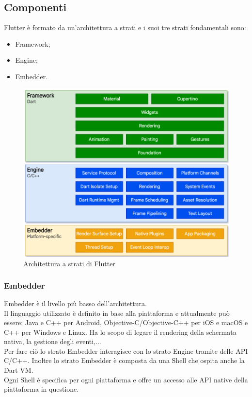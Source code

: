 \subsection{Componenti}
Flutter è formato da un'architettura a strati e i suoi tre strati fondamentali sono:
\begin{itemize}
	\item Framework; 
	\item Engine;  
	\item Embedder.\\
\end{itemize}
\begin{figure}[htbp]	
	\centering
	\includegraphics[width=13cm]{immagini/composizione.png}
	\caption{Architettura a strati di Flutter}
	\label{fig:Architettura a strati di Flutter}
\end{figure}

\newpage

\subsubsection{Embedder}
Embedder è il livello più basso dell'architettura.\\
Il linguaggio utilizzato è definito in base alla piattaforma e attualmente può essere: Java e C++ per Android, Objective-C/Objective-C++ per iOS e macOS e C++ per Windows e Linux.
Ha lo scopo di legare il rendering della schermata nativa, la gestione degli eventi,...\\
Per fare ciò lo strato Embedder interagisce con lo strato Engine tramite delle API C/C++.
Inoltre lo strato Embedder è composta da una Shell che ospita anche la Dart VM.		\\
Ogni Shell è specifica per ogni piattaforma e offre un accesso alle API native della piattaforma in questione.

